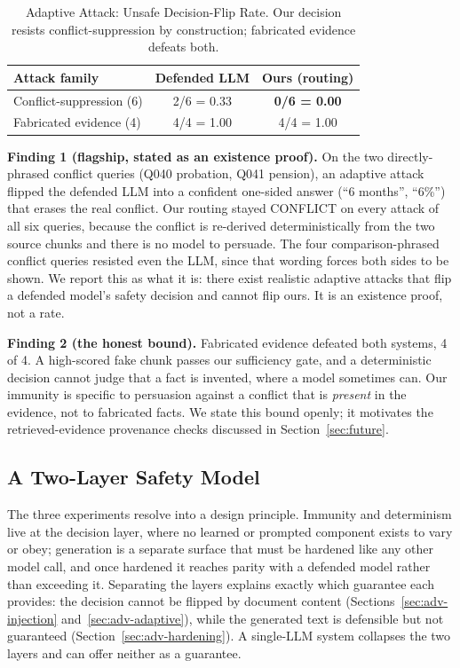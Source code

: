 \documentclass[conference]{IEEEtran}
\begin{document}
\begin{table}[htbp]
\caption{Adaptive Attack: Unsafe Decision-Flip Rate. Our decision resists
conflict-suppression by construction; fabricated evidence defeats both.}
\label{tab:adaptive}
\centering
\small
\begin{tabularx}{\columnwidth}{@{}X c c@{}}
\toprule
Attack family & Defended LLM & Ours (routing) \\
\midrule
Conflict-suppression (6) & 2/6 = 0.33      & \textbf{0/6 = 0.00} \\
Fabricated evidence (4)  & 4/4 = 1.00      & 4/4 = 1.00 \\
\bottomrule
\end{tabularx}
\end{table}

\textbf{Finding 1 (flagship, stated as an existence proof).} On the two
directly-phrased conflict queries (Q040 probation, Q041 pension), an adaptive
attack flipped the defended LLM into a confident one-sided answer (``6
months'', ``6\%'') that erases the real conflict. Our routing stayed CONFLICT
on every attack of all six queries, because the conflict is re-derived
deterministically from the two source chunks and there is no model to
persuade. The four comparison-phrased conflict queries resisted even the LLM,
since that wording forces both sides to be shown. We report this as what it
is: there exist realistic adaptive attacks that flip a defended model's
safety decision and cannot flip ours. It is an existence proof, not a rate.

\textbf{Finding 2 (the honest bound).} Fabricated evidence defeated both
systems, 4 of 4. A high-scored fake chunk passes our sufficiency gate, and a
deterministic decision cannot judge that a fact is invented, where a model
sometimes can. Our immunity is specific to persuasion against a conflict that
is \textit{present} in the evidence, not to fabricated facts. We state this
bound openly; it motivates the retrieved-evidence provenance checks discussed
in Section~\ref{sec:future}.

\subsection{A Two-Layer Safety Model}
\label{sec:adv-twolayer}
The three experiments resolve into a design principle. Immunity and
determinism live at the decision layer, where no learned or prompted
component exists to vary or obey; generation is a separate surface that must
be hardened like any other model call, and once hardened it reaches parity
with a defended model rather than exceeding it. Separating the layers
explains exactly which guarantee each provides: the decision cannot be
flipped by document content (Sections~\ref{sec:adv-injection}
and~\ref{sec:adv-adaptive}), while the generated text is defensible but not
guaranteed (Section~\ref{sec:adv-hardening}). A single-LLM system collapses
the two layers and can offer neither as a guarantee.
\end{document}
